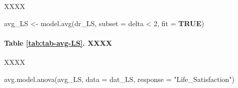 \documentclass[
  bookmarksnumbered]{article}
\newenvironment{Shaded}{\begin{snugshade}}{\end{snugshade}}
\newcommand{\AttributeTok}[1]{\textcolor[rgb]{0.80,0.80,0.80}{#1}}
\newcommand{\ConstantTok}[1]{\textcolor[rgb]{0.86,0.64,0.64}{\textbf{#1}}}
\newcommand{\DecValTok}[1]{\textcolor[rgb]{0.86,0.86,0.80}{#1}}
\newcommand{\FunctionTok}[1]{\textcolor[rgb]{0.94,0.94,0.56}{#1}}
\newcommand{\NormalTok}[1]{\textcolor[rgb]{0.80,0.80,0.80}{#1}}
\newcommand{\OtherTok}[1]{\textcolor[rgb]{0.94,0.94,0.56}{#1}}
\newcommand{\SpecialCharTok}[1]{\textcolor[rgb]{0.86,0.64,0.64}{#1}}
\newcommand{\StringTok}[1]{\textcolor[rgb]{0.80,0.58,0.58}{#1}}
\begin{document}
XXXX

\begin{Shaded}
\begin{Highlighting}[]
\NormalTok{avg\_LS }\OtherTok{\textless{}{-}} \FunctionTok{model.avg}\NormalTok{(dr\_LS, }\AttributeTok{subset =}\NormalTok{ delta }\SpecialCharTok{\textless{}} \DecValTok{2}\NormalTok{, }\AttributeTok{fit =} \ConstantTok{TRUE}\NormalTok{)}
\end{Highlighting}
\end{Shaded}

\paragraph{Table \ref{tab:tab-avg-LS}. XXXX}\label{table-reftabtab-avg-ls.-xxxx}

XXXX

\begin{Shaded}
\begin{Highlighting}[]
\FunctionTok{avg.model.anova}\NormalTok{(avg\_LS, }\AttributeTok{data =}\NormalTok{ dat\_LS, }\AttributeTok{response =} \StringTok{"Life\_Satisfaction"}\NormalTok{)}
\end{Highlighting}
\end{Shaded}
\end{document}
